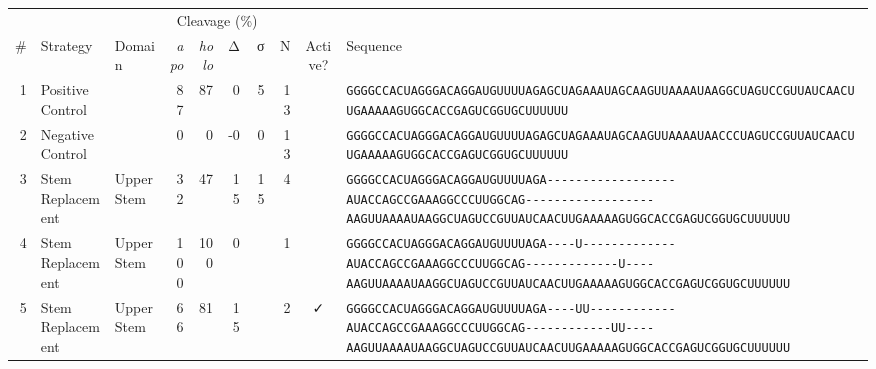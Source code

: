 \begin{tabular}{rllrrrrrcl}
\toprule

&
&
&
\multicolumn{4}{c}{Cleavage (\%)} &
&
&
\\
\cmidrule(r){4-7}

\# &
Strategy &
Domain &
\multicolumn{1}{r}{\textit{apo}} &
\multicolumn{1}{r}{\textit{holo}} &
\multicolumn{1}{r}{Δ} &
\multicolumn{1}{r}{σ} &
N &
Active? &
Sequence \\
\midrule

 1 & Positive Control &  & 87 & 87 & 0 & 5 & 13 &  &
 \color{ucsfdarkgrey}\verb|GGGGCCACUAGGGACAGGAU|\color{ucsforange}\verb|GUUUUA|\color{ucsfblue}\verb|GAGCUAGAAAUAGCAAGU|\color{ucsforange}\verb|UAAAAUAA|\color{ucsfnavy}\verb|GGCUAGUCC|\color{ucsforange}\verb|GUUAUCA|\color{ucsfteal}\verb|ACUUGAAAAAGU|\color{ucsforange}\verb|GGCACCGAGUCGGUGCUUUUUU| \\

 2 & Negative Control &  & 0 & 0 & -0 & 0 & 13 &  &
 \color{ucsfdarkgrey}\verb|GGGGCCACUAGGGACAGGAU|\color{ucsforange}\verb|GUUUUA|\color{ucsfblue}\verb|GAGCUAGAAAUAGCAAGU|\color{ucsforange}\verb|UAAAAUAA|\color{ucsfnavy}\verb|CCCUAGUCC|\color{ucsforange}\verb|GUUAUCA|\color{ucsfteal}\verb|ACUUGAAAAAGU|\color{ucsforange}\verb|GGCACCGAGUCGGUGCUUUUUU| \\

 3 & Stem Replacement & Upper Stem & 32 & 47 & 15 & 15 & 4 &  &
 \color{ucsfdarkgrey}\verb|GGGGCCACUAGGGACAGGAU|\color{ucsforange}\verb|GUUUUA|\color{ucsfblue}\verb|GA------------------|\color{ucsfpurple}\verb|AUACCAGCCGAAAGGCCCUUGGCAG|\color{ucsfblue}\verb|------------------AAGU|\color{ucsforange}\verb|UAAAAUAA|\color{ucsfnavy}\verb|GGCUAGUCC|\color{ucsforange}\verb|GUUAUCA|\color{ucsfteal}\verb|ACUUGAAAAAGU|\color{ucsforange}\verb|GGCACCGAGUCGGUGCUUUUUU| \\

 4 & Stem Replacement & Upper Stem & 100 & 100 & 0 &  & 1 &  &
 \color{ucsfdarkgrey}\verb|GGGGCCACUAGGGACAGGAU|\color{ucsforange}\verb|GUUUUA|\color{ucsfblue}\verb|GA----U-------------|\color{ucsfpurple}\verb|AUACCAGCCGAAAGGCCCUUGGCAG|\color{ucsfblue}\verb|-------------U----AAGU|\color{ucsforange}\verb|UAAAAUAA|\color{ucsfnavy}\verb|GGCUAGUCC|\color{ucsforange}\verb|GUUAUCA|\color{ucsfteal}\verb|ACUUGAAAAAGU|\color{ucsforange}\verb|GGCACCGAGUCGGUGCUUUUUU| \\

 5 & Stem Replacement & Upper Stem & 66 & 81 & 15 &  & 2 & ✓ &
 \color{ucsfdarkgrey}\verb|GGGGCCACUAGGGACAGGAU|\color{ucsforange}\verb|GUUUUA|\color{ucsfblue}\verb|GA----UU------------|\color{ucsfpurple}\verb|AUACCAGCCGAAAGGCCCUUGGCAG|\color{ucsfblue}\verb|------------UU----AAGU|\color{ucsforange}\verb|UAAAAUAA|\color{ucsfnavy}\verb|GGCUAGUCC|\color{ucsforange}\verb|GUUAUCA|\color{ucsfteal}\verb|ACUUGAAAAAGU|\color{ucsforange}\verb|GGCACCGAGUCGGUGCUUUUUU| \\


\end{tabular}
